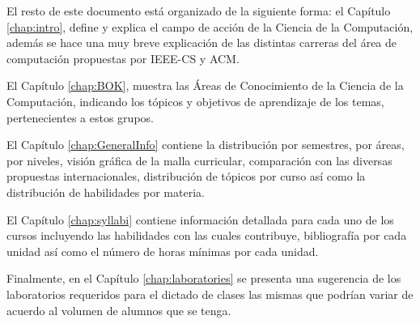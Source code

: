 \OtherKeyStones

El resto de este documento está organizado de la siguiente forma: el Capítulo \ref{chap:intro}, 
define y explica el campo de acción de la Ciencia de la Computación, 
además se hace una muy breve explicación de las distintas carreras del área de 
computación propuestas por IEEE-CS y ACM.




El Capítulo \ref{chap:BOK}, muestra las Áreas de Conocimiento de la Ciencia de la Computación, 
indicando los tópicos y objetivos de aprendizaje de los temas, pertenecientes a estos grupos.

El Capítulo \ref{chap:GeneralInfo} contiene la distribución por semestres, por áreas, por niveles, 
visión gráfica de la malla curricular, comparación con las diversas propuestas internacionales, 
distribución de tópicos por curso así como la distribución de habilidades por materia.

El Capítulo \ref{chap:syllabi} contiene información detallada para cada uno de los cursos 
incluyendo las habilidades con las cuales contribuye, bibliografía por cada unidad así 
como el número de horas mínimas por cada unidad.


Finalmente, en el Capítulo \ref{chap:laboratories} se presenta una sugerencia de los laboratorios 
requeridos para el dictado de clases las mismas que podrían variar de acuerdo al volumen de alumnos que se tenga.

\newpage